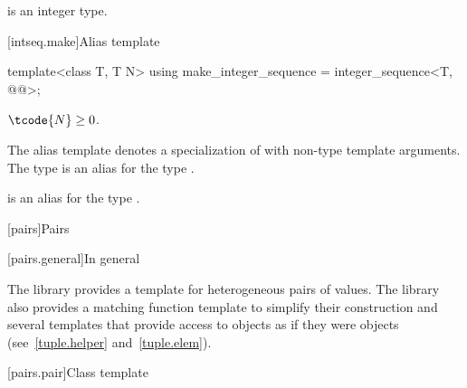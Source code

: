 \pnum
\mandates
{} is an integer type.

[intseq.make]{Alias template }

%
\begin{itemdecl}
template<class T, T N>
  using make_integer_sequence = integer_sequence<T, @\seebelow{}@>;
\end{itemdecl}

\begin{itemdescr}
\pnum
\mandates
$\tcode{N} \geq 0$.

\pnum
The alias template
 denotes a specialization of
 with  non-type template arguments.
The type  is an alias for the type
.
\begin{note}
 is an alias for the type
.
\end{note}
\end{itemdescr}

[pairs]{Pairs}

[pairs.general]{In general}

\pnum
The library provides a template for heterogeneous pairs of values.
The library also provides a matching function template to simplify
their construction and several templates that provide access to 
objects as if they were  objects (see~\ref{tuple.helper}
and~\ref{tuple.elem}).%
%
%
%

[pairs.pair]{Class template }

